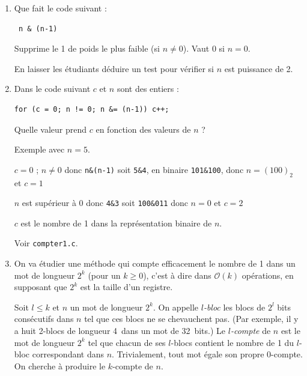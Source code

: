 \documentclass[11pt]{article}
\begin{document}
\begin{enumerate}
 \item Que fait le code suivant :

\begin{verbatim}
 n & (n-1)
\end{verbatim}

\begin{solution}
Supprime le 1 de poids le plus faible (si $n\ne0$). Vaut 0 si $n=0$.
\end{solution}
\begin{remarque}
En laisser les étudiants déduire un test pour vérifier si $n$ est puissance de 2.
\end{remarque}

 \item Dans le code suivant $c$ et $n$ sont des entiers :
\begin{verbatim}
for (c = 0; n != 0; n &= (n-1)) c++;
\end{verbatim}
 Quelle valeur prend $c$ en fonction des valeurs de $n$ ?

\begin{solution}

Exemple avec $n=5$.

$c=0$ ; $n\ne0$ donc \verb+n&(n-1)+ soit \verb+5&4+, en binaire \verb+101&100+,
donc $n=(100)_2$ et $c=1$

$n$ est supérieur à 0 donc \verb+4&3+ soit \verb+100&011+
donc $n=0$ et $c=2$

$c$ est le nombre de 1 dans la représentation binaire de $n$.
\end{solution}
\begin{remarque}
Voir \verb+compter1.c+.
\end{remarque}

\item On va étudier une méthode qui compte efficacement le nombre de 1
 dans un mot de longueur $2^k$ (pour un $k\ge0$), c'est à dire dans
 $\mathcal{O}(k)$ opérations, en supposant que $2^k$ est la taille d'un
 registre.

 Soit $l\le k$ et $n$ un mot de longueur $2^k$.
 On appelle \emph{$l$-bloc} les blocs de $2^l$ bits consécutifs dans $n$
 tel que ces blocs ne se chevauchent pas. (Par exemple, il y a huit 2-blocs
 de longueur 4~dans un mot de 32~bits.) Le \emph{$l$-compte} de $n$
 est le mot de longueur $2^k$ tel que
 chacun de ses $l$-blocs contient le nombre de 1 du
 $l$-bloc correspondant dans $n$.
 Trivialement, tout mot égale son propre $0$-compte.
 On cherche à produire le $k$-compte de $n$.


\end{enumerate}
\end{document}
